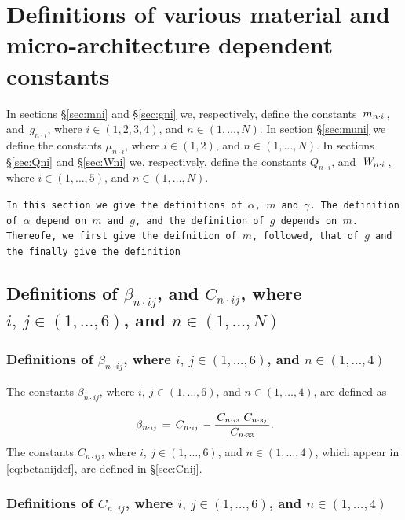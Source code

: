 \documentclass[preprint,12pt,times,draft]{elsarticle}
\numberwithin{equation}{section}
\newcommand{\msub}[2]{
\IfEqCase{#2}{
      {i}{\, m_{#1\cdot #2}\,}%
  }[\,m_{#1\cdot {\scriptscriptstyle #2}}\,]}
\newcommand{\gsub}[2]{g_{#1\cdot #2}}
\newcommand{\Qsub}[2]{Q_{#1\cdot #2}}
\newcommand{\Wsub}[2]{
\IfEqCase{#2}{
      {i}{\, W_{#1\cdot #2}\,}%
  }[\,W_{#1\cdot {\scriptscriptstyle #2}}\,]}
\newcommand{\musub}[2]{\mu_{#1\cdot #2}}
\newcommand{\betasub}[2]{
\IfEqCase{#2}{
       {xxxx}{\,\beta_{ {#1}\cdot { #2}}\,}%
   }[\,\beta_{ {#1}\cdot {\scriptscriptstyle #2}}\,]}
\newcommand{\Csub}[2]{
   \IfEqCase{#2}{
          {xxxx}{\,\beta_{ {#1}\cdot { #2}}\,}%
      }[\,C_{ {#1}\cdot {\scriptscriptstyle #2}}\,]}
\newcommand{\infour}{\in(1,\ldots,4)}
\newcommand{\insix}{\in(1,\ldots,6)}
\newcommand{\inN}{\in(1,\ldots,N)}
\renewcommand{\>}{$\Rightarrow$}
\begin{document}
\newpage
\appendix

\section{Definitions of various material and micro-architecture dependent constants}
\label{Appen:MatConst}



In sections \S\ref{sec:mni} and \S\ref{sec:gni} we, respectively, define the constants $\msub{n}{i}$, and~$\gsub{n}{i}$, where $i\in (1,2,3,4)$, and $n\in(1,\ldots,N)$. In section \S\ref{sec:muni} we define the constants $\musub{n}{i}$, where $i\in (1,2)$, and $n\in(1,\ldots,N)$. In sections \S\ref{sec:Qni} and \S\ref{sec:Wni} we, respectively, define the constants $\Qsub{n}{i}$, and~$\Wsub{n}{i}$, where $i\in (1,\ldots,5)$, and $n\in(1,\ldots,N)$.


\texttt{In this section we give the definitions of $\alpha$, $m$ and $\gamma$. The definition of $\alpha$ depend on $m$ and $g$, and the definition of $g$ depends on $m$. Thereofe, we first give the deifnition of $m$, followed, that of $g$ and the finally give the definition}


\subsection{Definitions of $\beta_{n\cdot i j}$, and $C_{n\cdot i j}$, where $i,~j\insix$, and $n\inN$\label{sec:betaCnij}}


\subsubsection{Definitions of $\beta_{n\cdot i j}$, where $i,~j\insix$, and $n\infour$\label{sec:betaCnij}\label{sec:betanij}}

The constants $\beta_{n\cdot i j}$, where $i,~j\insix$, and $n\infour$, are defined as

\begin{equation}
\betasub{n}{ij} = \Csub{n}{ij}-\frac{\Csub{n}{i3} \Csub{n}{3j}}{\Csub{n}{33}}.
\label{eq:betanijdef}
\end{equation}
The constants $C_{n\cdot i j}$, where $i,~j\insix$, and $n\infour$, which appear in \eqref{eq:betanijdef}, are defined in \S\ref{sec:Cnij}.


\subsubsection{Definitions of $C_{n\cdot i j}$, where $i,~j\insix$, and $n\infour$\label{sec:Cnij}}
\end{document}

